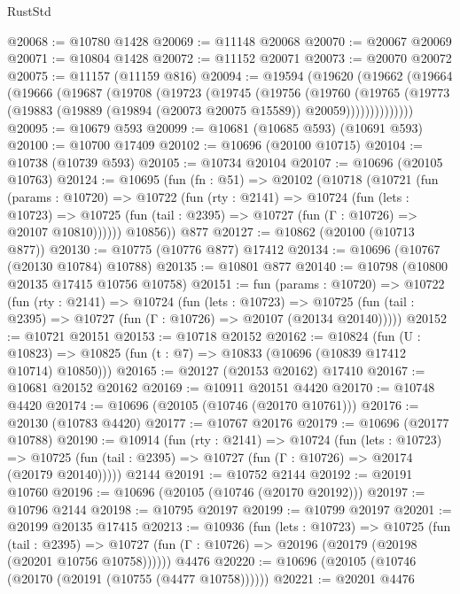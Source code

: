 \begin{lexlean}{RustStd}
\begin{coremodule}
@20068 := @10780 @1428
@20069 := @11148 @20068
@20070 := @20067 @20069
@20071 := @10804 @1428
@20072 := @11152 @20071
@20073 := @20070 @20072
@20075 := @11157 (@11159 @816)
@20094 := @19594
    (@19620
      (@19662
        (@19664
          (@19666
            (@19687
              (@19708
                (@19723
                  (@19745
                    (@19756
                      (@19760
                        (@19765
                          (@19773
                            (@19883 (@19889 (@19894 (@20073 @20075 @15589)) @20059))))))))))))))
@20095 := @10679 @593
@20099 := @10681 (@10685 @593) (@10691 @593)
@20100 := @10700 @17409
@20102 := @10696 (@20100 @10715)
@20104 := @10738 (@10739 @593)
@20105 := @10734 @20104
@20107 := @10696 (@20105 @10763)
@20124 := @10695
    (fun (fn : @51) =>
    @20102
      (@10718
        (@10721
          (fun (params : @10720) =>
          @10722
            (fun (rty : @2141) =>
            @10724
              (fun (lets : @10723) =>
              @10725 (fun (tail : @2395) => @10727 (fun (Γ : @10726) => @20107 @10810))))))
        @10856))
    @877
@20127 := @10862 (@20100 (@10713 @877))
@20130 := @10775 (@10776 @877) @17412
@20134 := @10696 (@10767 (@20130 @10784) @10788)
@20135 := @10801 @877
@20140 := @10798 (@10800 @20135 @17415 @10756 @10758)
@20151 := fun (params : @10720) =>
  @10722
    (fun (rty : @2141) =>
    @10724
      (fun (lets : @10723) =>
      @10725 (fun (tail : @2395) => @10727 (fun (Γ : @10726) => @20107 (@20134 @20140)))))
@20152 := @10721 @20151
@20153 := @10718 @20152
@20162 := @10824
    (fun (U : @10823) => @10825 (fun (t : @7) => @10833 (@10696 (@10839 @17412 @10714) @10850)))
@20165 := @20127 (@20153 @20162) @17410
@20167 := @10681 @20152 @20162
@20169 := @10911 @20151 @4420
@20170 := @10748 @4420
@20174 := @10696 (@20105 (@10746 (@20170 @10761)))
@20176 := @20130 (@10783 @4420)
@20177 := @10767 @20176
@20179 := @10696 (@20177 @10788)
@20190 := @10914
    (fun (rty : @2141) =>
    @10724
      (fun (lets : @10723) =>
      @10725 (fun (tail : @2395) => @10727 (fun (Γ : @10726) => @20174 (@20179 @20140)))))
    @2144
@20191 := @10752 @2144
@20192 := @20191 @10760
@20196 := @10696 (@20105 (@10746 (@20170 @20192)))
@20197 := @10796 @2144
@20198 := @10795 @20197
@20199 := @10799 @20197
@20201 := @20199 @20135 @17415
@20213 := @10936
    (fun (lets : @10723) =>
    @10725
      (fun (tail : @2395) =>
      @10727 (fun (Γ : @10726) => @20196 (@20179 (@20198 (@20201 @10756 @10758))))))
    @4476
@20220 := @10696 (@20105 (@10746 (@20170 (@20191 (@10755 (@4477 @10758))))))
@20221 := @20201 @4476

\end{coremodule}
\end{lexlean}
